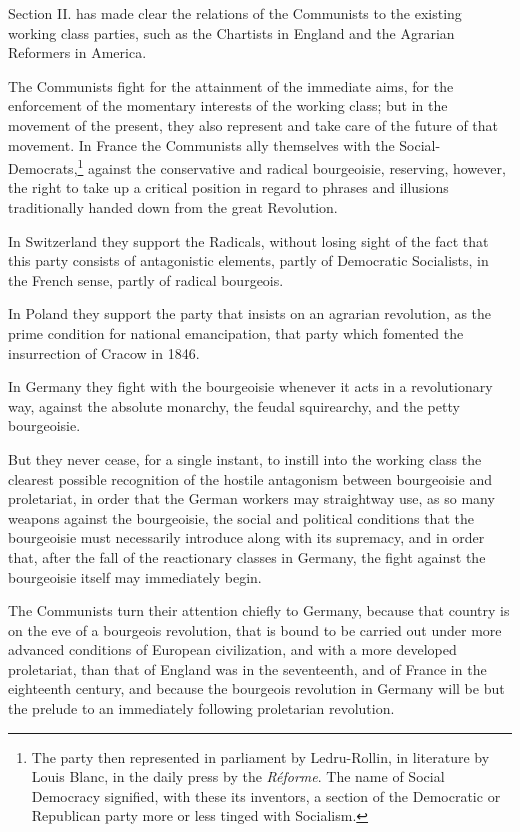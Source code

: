 Section II. has made clear the relations of the Communists to the existing working class parties, such as the Chartists in England and the Agrarian Reformers in America.

The Communists fight for the attainment of the immediate aims, for the enforcement of the momentary interests of the working class; but in the movement of the present, they also represent and take care of the future of that movement. In France the Communists ally themselves with the Social-Democrats,\footnote{The party then represented in parliament by Ledru-Rollin, in literature by Louis Blanc, in the daily press by the \emph{Réforme}. The name of Social Democracy signified, with these its inventors, a section of the Democratic or Republican party more or less tinged with Socialism.} against the conservative and radical bourgeoisie, reserving, however, the right to take up a critical position in regard to phrases and illusions traditionally handed down from the great Revolution.

In Switzerland they support the Radicals, without losing sight of the fact that this party consists of antagonistic elements, partly of Democratic Socialists, in the French sense, partly of radical bourgeois.

In Poland they support the party that insists on an agrarian revolution, as the prime condition for national emancipation, that party which fomented the insurrection of Cracow in 1846.

In Germany they fight with the bourgeoisie whenever it acts in a revolutionary way, against the absolute monarchy, the feudal squirearchy, and the petty bourgeoisie.

But they never cease, for a single instant, to instill into the working class the clearest possible recognition of the hostile antagonism between bourgeoisie and proletariat, in order that the German workers may straightway use, as so many weapons against the bourgeoisie, the social and political conditions that the bourgeoisie must necessarily introduce along with its supremacy, and in order that, after the fall of the reactionary classes in Germany, the fight against the bourgeoisie itself may immediately begin.

The Communists turn their attention chiefly to Germany, because that country is on the eve of a bourgeois revolution, that is bound to be carried out under more advanced conditions of European civilization, and with a more developed proletariat, than that of England was in the seventeenth, and of France in the eighteenth century, and because the bourgeois revolution in Germany will be but the prelude to an immediately following proletarian revolution.

